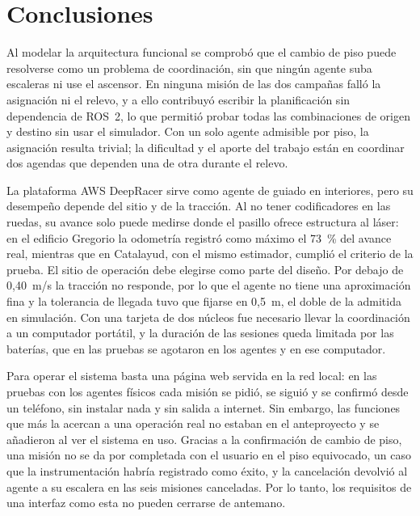 %
\chapter*{Conclusiones}

Al modelar la arquitectura funcional se comprobó que el cambio de piso puede
resolverse como un problema de coordinación, sin que ningún agente suba escaleras ni
use el ascensor. En ninguna misión de las dos campañas falló la asignación ni el
relevo, y a ello contribuyó escribir la planificación sin dependencia de ROS~2, lo que
permitió probar todas las combinaciones de origen y destino sin usar el simulador. Con
un solo agente admisible por piso, la asignación resulta trivial; la dificultad y el aporte del trabajo están en coordinar dos agendas que dependen una de otra durante el relevo.

La plataforma AWS DeepRacer sirve como agente de guiado en interiores, pero su
desempeño depende del sitio y de la tracción. Al no tener codificadores en las ruedas,
su avance solo puede medirse donde el pasillo ofrece estructura al láser: en el
edificio Gregorio la odometría registró como máximo el 73~\% del avance real, mientras
que en Catalayud, con el mismo estimador, cumplió el criterio de la prueba. El sitio de operación debe elegirse como parte del diseño. Por debajo de 0,40~m/s la
tracción no responde, por lo que el agente no tiene una aproximación fina y la
tolerancia de llegada tuvo que fijarse en 0,5~m, el doble de la admitida en simulación.
Con una tarjeta de dos núcleos fue necesario llevar la coordinación a un computador
portátil, y la duración de las sesiones queda limitada por las baterías, que en las pruebas se agotaron en los agentes y en ese computador.

Para operar el sistema basta una página web servida en la red local: en las pruebas
con los agentes físicos cada misión se pidió, se siguió y se confirmó desde un
teléfono, sin instalar nada y sin salida a internet. Sin embargo, las funciones que más
la acercan a una operación real no estaban en el anteproyecto y se añadieron al ver el
sistema en uso. Gracias a la confirmación de cambio de piso, una misión no se da por
completada con el usuario en el piso equivocado, un caso que la instrumentación habría
registrado como éxito, y la cancelación devolvió al agente a su escalera en las seis
misiones canceladas. Por lo tanto, los requisitos de una interfaz como esta no pueden cerrarse de antemano.

